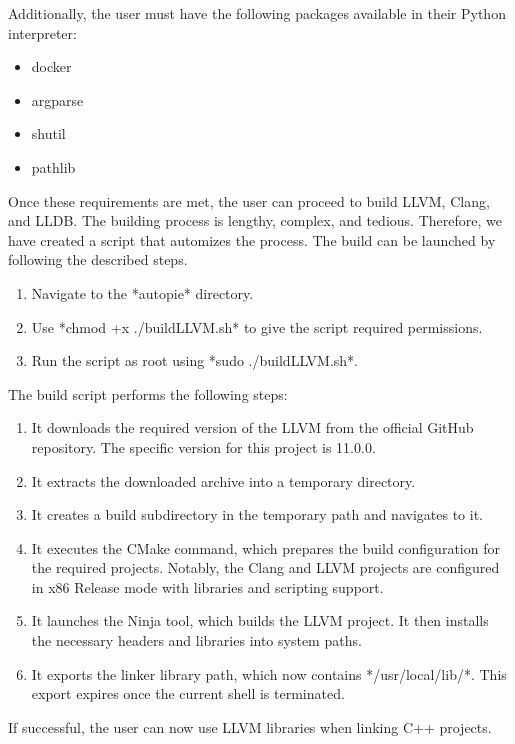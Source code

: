 \documentclass[12pt,a4paper]{report}
\begin{document}
Additionally, the user must have the following packages available in their 
Python interpreter:

\begin{itemize}
  \item docker
  \item argparse
  \item shutil
  \item pathlib
\end{itemize}

Once these requirements are met, the user can proceed to build LLVM, Clang, 
and LLDB. 
The building process is lengthy, complex, and tedious. 
Therefore, we have created a script that automizes the process. 
The build can be launched by following the described steps.

\begin{enumerate}
  \item Navigate to the *autopie* directory.
  \item Use *chmod +x ./buildLLVM.sh* to give the script required permissions.
  \item Run the script as root using *sudo ./buildLLVM.sh*.
\end{enumerate}

The build script performs the following steps:

\begin{enumerate}
  \item It downloads the required version of the LLVM from the official GitHub repository. The specific version for this project is 11.0.0.
  \item It extracts the downloaded archive into a temporary directory.
  \item It creates a build subdirectory in the temporary path and navigates to it.
  \item It executes the CMake command, which prepares the build configuration for the required projects. Notably, the Clang and LLVM projects are configured in x86 Release mode with libraries and scripting support.
  \item It launches the Ninja tool, which builds the LLVM project. It then installs the necessary headers and libraries into system paths.
  \item It exports the linker library path, which now contains */usr/local/lib/*. This export expires once the current shell is terminated.
\end{enumerate}

If successful, the user can now use LLVM libraries when linking C++ projects.
\end{document}
